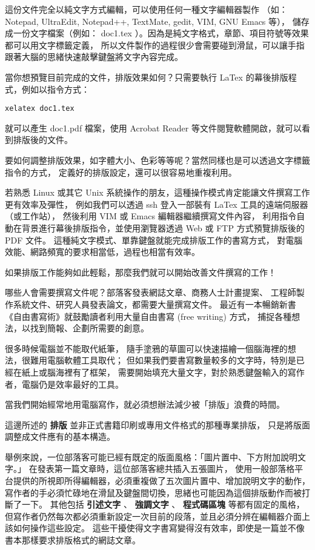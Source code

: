 \documentclass[a4paper,12pt,english]{sphinxmanual}
\begin{document}
這份文件完全以純文字方式編輯，可以使用任何一種文字編輯器製作
（如： Notepad, UltraEdit, Notepad++, TextMate, gedit, VIM, GNU Emacs 等），
儲存成一份文字檔案（例如： doc1.tex ）。因為是純文字格式，章節、項目符號等效果都可以用文字標籤定義，
所以文件製作的過程很少會需要碰到滑鼠，可以讓手指跟著大腦的思緒快速敲擊鍵盤將文字內容完成。

當你想預覽目前完成的文件，排版效果如何？只需要執行 LaTex 的幕後排版程式，例如以指令方式：

\begin{Verbatim}[commandchars=@\[\]]
xelatex doc1.tex
\end{Verbatim}

就可以產生 doc1.pdf 檔案，使用 Acrobat Reader 等文件閱覽軟體開啟，就可以看到排版後的文件。

要如何調整排版效果，如字體大小、色彩等等呢？當然同樣也是可以透過文字標籤指令的方式，
定義好的排版設定，還可以很容易地重複利用。

若熟悉 Linux 或其它 Unix 系統操作的朋友，這種操作模式肯定能讓文件撰寫工作更有效率及彈性，
例如我們可以透過 ssh 登入一部裝有 LaTex 工具的遠端伺服器（或工作站），
然後利用 VIM 或 Emacs 編輯器繼續撰寫文件內容，
利用指令自動在背景進行幕後排版指令，並使用瀏覽器透過 Web 或 FTP 方式預覽排版後的 PDF 文件。
這種純文字模式、單靠鍵盤就能完成排版工作的書寫方式，
對電腦效能、網路頻寬的要求相當低，過程也相當有效率。

如果排版工作能夠如此輕鬆，那麼我們就可以開始改善文件撰寫的工作！

哪些人會需要撰寫文件呢？部落客發表網誌文章、商務人士計畫提案、
工程師製作系統文件、研究人員發表論文，都需要大量撰寫文件。
最近有一本暢銷新書《自由書寫術》就鼓勵讀者利用大量自由書寫 (free writing) 方式，
捕捉各種想法，以找到簡報、企劃所需要的創意。

很多時候電腦並不能取代紙筆，
隨手塗鴉的草圖可以快速描繪一個腦海裡的想法，很難用電腦軟體工具取代；
但如果我們要書寫數量較多的文字時，特別是已經在紙上或腦海裡有了框架，
需要開始填充大量文字，對於熟悉鍵盤輸入的寫作者，電腦仍是效率最好的工具。

當我們開始經常地用電腦寫作，就必須想辦法減少被「排版」浪費的時間。

這邊所述的 \textbf{排版} 並非正式書籍印刷或專用文件格式的那種專業排版，
只是將版面調整成文件應有的基本構造。

舉例來說，一位部落客可能已經有既定的版面風格：「圖片置中、下方附加說明文字。」
在發表第一篇文章時，這位部落客總共插入五張圖片，
使用一般部落格平台提供的所視即所得編輯器，必須重複做了五次圖片置中、增加說明文字的動作，
寫作者的手必須忙碌地在滑鼠及鍵盤間切換，思緒也可能因為這個排版動作而被打斷了一下。
其他包括 \textbf{引述文字} 、 \textbf{強調文字} 、 \textbf{程式碼區塊} 等都有固定的風格，
但寫作者仍然每次都必須重新設定一次目前的段落，並且必須分辨在編輯器介面上該如何操作這些設定。
這些干擾使得文字書寫變得沒有效率，即使是一篇並不像書本那樣要求排版格式的網誌文章。
\end{document}

